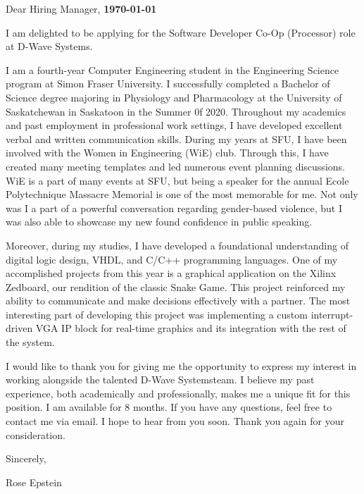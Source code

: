 \documentclass[letterpaper,11pt]{article}
\newcommand{\roleName}{Software Developer Co-Op (Processor)}
\newcommand{\company}{D-Wave Systems\hspace{4px}}
\begin{document}
    \vspace*{10pt}
    \par Dear Hiring Manager,  \hfill \textbf{\today}
    \vspace*{10pt}
    \par I am delighted to be applying for the \roleName{} role at \company.
    \vspace*{10pt}
    \par I am a fourth-year Computer Engineering student in the Engineering Science program at Simon Fraser University. I successfully
    completed a Bachelor of Science degree majoring in Physiology and Pharmacology at the University of Saskatchewan in Saskatoon in the Summer 0f 2020.
    Throughout my academics and past employment in professional work settings, I have developed excellent verbal and written communication skills. 
    During my years at SFU, I have been involved with the Women in Engineering (WiE) club. Through this, I have created many meeting templates and led numerous event planning discussions. 
    WiE is a part of many events at SFU, but being a speaker for the annual Ecole Polytechnique Massacre Memorial is one of the most memorable for me. 
    Not only was I a part of a powerful conversation regarding gender-based violence, but I was also able to showcase my new found confidence in public speaking. 
    \vspace*{10pt}
    \par Moreover, during my studies, I have developed a foundational understanding of digital logic design, VHDL, and C/C++ programming languages. 
    One of my accomplished projects from this year is a graphical application on the Xilinx Zedboard, our rendition of the classic Snake Game. This project reinforced 
    my ability to communicate and make decisions effectively with a partner. The most interesting part of developing this project was implementing a 
    custom interrupt-driven VGA IP block for real-time graphics and its integration with the rest of the system.
    \vspace*{10pt}
    \par I would like to thank you for giving me the opportunity to express my interest in working alongside
    the talented \company team. I believe my past experience, both academically and professionally, makes
    me a unique fit for this position. I am available for 8 months. If you have any questions, feel free to contact me via email. I hope to hear from you
    soon. Thank you again for your consideration.
    \vspace*{10pt}
    \par Sincerely,
    \par Rose Epstein
\end{document}
